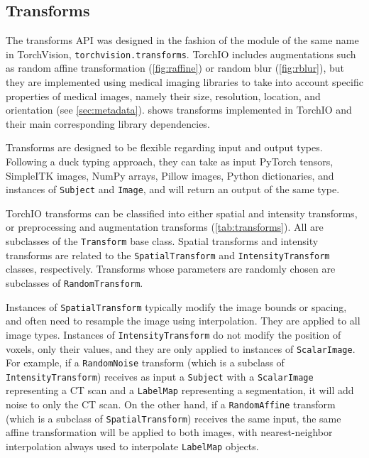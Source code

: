 \subsection{Transforms}
\label{sec:transforms}

The transforms \ac{API} was designed in the fashion of the module of the same name in TorchVision, \texttt{torchvision.transforms}.
TorchIO includes augmentations such as random affine transformation (\cref{fig:raffine}) or random blur (\cref{fig:rblur}), but they are implemented using medical imaging libraries \cite{lowekamp_design_2013,brett_nipynibabel_2020} to take into account specific properties of medical images, namely their size, resolution, location, and orientation (see \cref{sec:metadata}).
 shows transforms implemented in TorchIO \torchioversion and their main corresponding library dependencies.





Transforms are designed to be flexible regarding input and output types.
Following a duck typing approach, they can take as input PyTorch tensors, SimpleITK images, NumPy arrays, Pillow images, Python dictionaries, and instances of \texttt{Subject} and \texttt{Image}, and will return an output of the same type.

TorchIO transforms can be classified into either spatial and intensity transforms, or preprocessing and augmentation transforms (\cref{tab:transforms}).
All are subclasses of the \texttt{Transform} base class.
Spatial transforms and intensity transforms are related to the \texttt{SpatialTransform} and \texttt{IntensityTransform} classes, respectively.
Transforms whose parameters are randomly chosen are subclasses of \texttt{RandomTransform}.

Instances of \texttt{SpatialTransform} typically modify the image bounds or spacing, and often need to resample the image using interpolation.
They are applied to all image types.
Instances of \texttt{IntensityTransform} do not modify the position of voxels, only their values, and they are only applied to instances of \texttt{ScalarImage}.
For example, if a \texttt{RandomNoise} transform (which is a subclass of \texttt{IntensityTransform}) receives as input a \texttt{Subject} with a \texttt{ScalarImage} representing a \ac{CT} scan and a \texttt{LabelMap} representing a segmentation, it will add noise to only the \ac{CT} scan.
On the other hand, if a \texttt{RandomAffine} transform (which is a subclass of \texttt{SpatialTransform}) receives the same input, the same affine transformation will be applied to both images, with nearest-neighbor interpolation always used to interpolate \texttt{LabelMap} objects.


